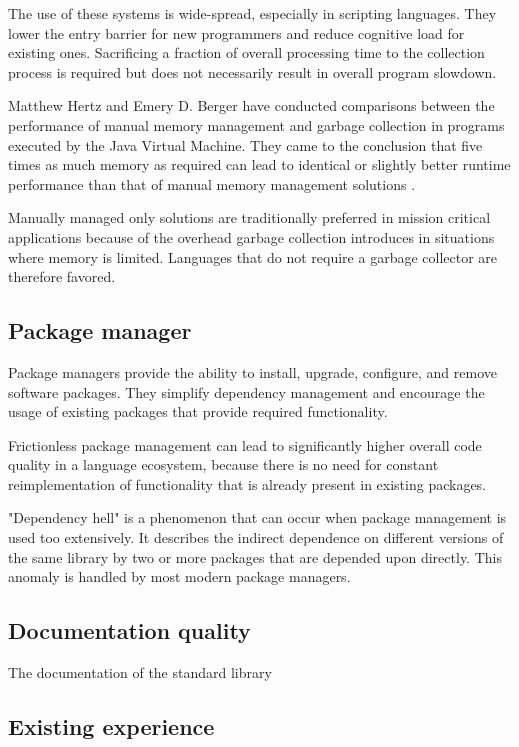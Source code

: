 The use of these systems is wide-spread, especially in scripting languages. They lower the entry barrier for new programmers and reduce cognitive load for existing ones. Sacrificing a fraction of overall processing time to the collection process is required but does not necessarily result in overall program slowdown. 

Matthew Hertz and Emery D. Berger have conducted comparisons between the performance of manual memory management and garbage collection in programs executed by the Java Virtual Machine. They came to the conclusion that five times as much memory as required can lead to identical or slightly better runtime performance than that of manual memory management solutions \cite{garbage-collection-vs-manual}. 

Manually managed only solutions are traditionally preferred in mission critical applications because of the overhead garbage collection introduces in situations where memory is limited. Languages that do not require a garbage collector are therefore favored.

\subsection{Package manager}
Package managers provide the ability to install, upgrade, configure, and remove software packages. They simplify dependency management and encourage the usage of existing packages that provide required functionality. 

Frictionless package management can lead to significantly higher overall code quality in a language ecosystem, because there is no need for constant reimplementation of functionality that is already present in existing packages. 

"Dependency hell" is a phenomenon that can occur when package management is used too extensively. It describes the indirect dependence on different versions of the same library by two or more packages that are depended upon directly. This anomaly is handled by most modern package managers. 

\subsection{Documentation quality}
The documentation of the standard library 


\subsection{Existing experience}



